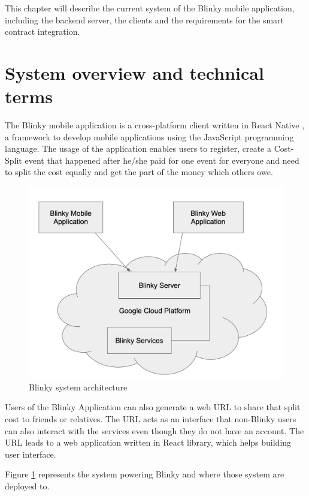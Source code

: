 \documentclass[twoside,numperchapter]{tutthesis} %
\begin{document}
This chapter will describe the current system of the Blinky mobile application, including the backend server, the clients  and the requirements for the smart contract integration.

\section{System overview and technical terms}

The Blinky mobile application is a cross-platform client written in React Native \citep{ReactNative}, a framework to develop mobile applications using the JavaScript programming language. The usage of the application enables users to register, create a Cost-Split event that happened after he/she paid for one event for everyone and need to split the cost equally and get the part of the money which others owe.

\begin{figure}
    \centering
    \includegraphics[width=\linewidth]{blinky_system_architecture.jpg}
    \caption{Blinky system architecture}
    \label{fig:blinky_system}
\end{figure}

Users of the Blinky Application can also generate a web URL to share that split cost to friends or relatives. The URL acts as an interface that non-Blinky users can also interact with the services even though they do not have an account. The URL leads to a web application written in React library, which helps building user interface.

Figure \ref{fig:blinky_system} represents the system powering Blinky and where those system are deployed to. 
\end{document}
